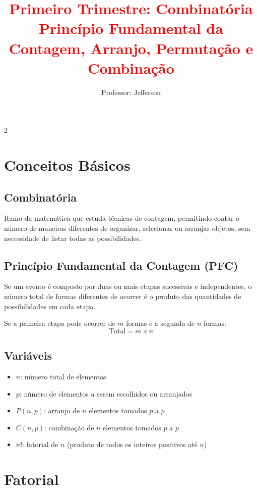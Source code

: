 \documentclass[11pt]{article}
\title{\textcolor{red}{Primeiro Trimestre: Combinatória
    \\Princípio Fundamental da Contagem, Arranjo, Permutação e Combinação}}
\author{Professor: Jefferson}
\date{}
\begin{document}
\maketitle
\vspace{-1cm}

\begin{multicols}{2}

\section*{Conceitos Básicos}

\subsection*{Combinatória}
Ramo da matemática que estuda técnicas de contagem, permitindo contar o número de maneiras diferentes de organizar, selecionar ou arranjar objetos, sem necessidade de listar todas as possibilidades.

\subsection*{Princípio Fundamental da Contagem (PFC)}
Se um evento é composto por duas ou mais etapas sucessivas e independentes, o número total de formas diferentes de ocorrer é o produto das quantidades de possibilidades em cada etapa.

Se a primeira etapa pode ocorrer de $m$ formas e a segunda de $n$ formas:
\[
\text{Total} = m \times n
\]

\subsection*{Variáveis}
\begin{itemize}
\item $n$: número total de elementos
\item $p$: número de elementos a serem escolhidos ou arranjados
\item $P(n, p)$: arranjo de $n$ elementos tomados $p$ a $p$
\item $C(n, p)$: combinação de $n$ elementos tomados $p$ a $p$
\item $n!$: fatorial de $n$ (produto de todos os inteiros positivos até $n$)
\end{itemize}

\section*{Fatorial}


\end{multicols}
\end{document}
